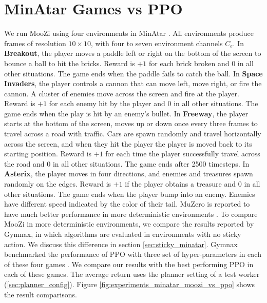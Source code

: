 \section{MinAtar Games vs PPO}
We run MooZi using four environments in MinAtar \cite{MinAtarAtariInspiredTestbed_Young.Tian_2019}.
All environments produce frames of resolution $10 \times 10$, with four to seven environment channels $C_e$.
In \textbf{Breakout}, the player moves a paddle left or right on the bottom of the screen to bounce a ball to hit the bricks.
Reward is $+1$ for each brick broken and $0$ in all other situations.
The game ends when the paddle fails to catch the ball.
In \textbf{Space Invaders}, the player controls a cannon that can move left, move right, or fire the cannon.
A cluster of enemies move across the screen and fire at the player.
Reward is $+1$ for each enemy hit by the player and $0$ in all other situations.
The game ends when the play is hit by an enemy's bullet.
In \textbf{Freeway}, the player starts at the bottom of the screen, moves up or down once every three frames to travel across a road with traffic.
Cars are spawn randomly and travel horizontally across the screen, and when they hit the player the player is moved back to its starting position.
Reward is $+1$ for each time the player successfully travel across the road and $0$ in all other situations.
The game ends after 2500 timesteps.
In \textbf{Asterix}, the player moves in four directions, and enemies and treasures spawn randomly on the edges.
Reward is $+1$ if the player obtains a treasure and $0$ in all other situations.
The game ends when the player bump into an enemy.
Enemies have different speed indicated by the color of their tail.
MuZero is reported to have much better performance in more deterministic environments \cite{VectorQuantizedModels_Ozair.Li.ea_2021}.
To compare MooZi in more deterministic environments, we compare the results reported by Gymnax, in which algorithms are evaluated in environments with no sticky action.
We discuss this difference in section \ref{sec:sticky_minatar}.
Gymnax benchmarked the performance of PPO with three set of hyper-parameters in each of these four games \cite{GymnaxJAXbasedReinforcement_RobertTjarkoLange_2022,ProximalPolicyOptimization_Schulman.Wolski.ea_2017}.
We compare our results with the best performing PPO in each of these games.
The average return uses the planner setting of a test worker (\ref{sec:planner_config}).
Figure \ref{fig:experiments_minatar_moozi_vs_ppo} shows the result comparisons.

